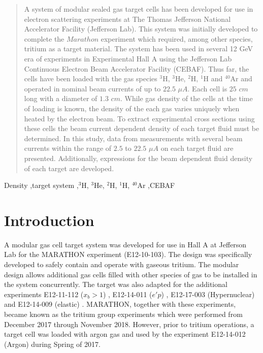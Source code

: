 \documentclass[final,5p,times,twocolumn]{elsarticle}
\begin{document}
\begin{frontmatter}
\begin{abstract}
A system of modular sealed gas target cells has been developed for use in electron scattering experiments at The Thomas Jefferson National Accelerator Facility (Jefferson Lab). This system was initially developed to complete the $Marathon$ experiment which required, among other species, tritium as a target material. The system has been used in several 12 GeV era of experiments in Experimental Hall A using the Jefferson Lab Continuous Electron Beam Accelerator Facility (CEBAF). Thus far, the cells have been loaded with the gas species $^{3}$H, $^{3}$He, $^{2}$H, $^{1}$H and $^{40}$Ar and operated in nominal beam currents of up to $22.5$ $\mu A$.  Each cell is $25$ $cm$ long with a diameter of $1.3$ $cm$. While gas density of the cells at the time of loading is known, the density of the each gas varies uniquely when heated by the electron beam. To extract experimental cross sections using these cells the beam current dependent density of each target fluid must be determined. In this study, data from measurements with several beam currents within the range of $2.5$ to $22.5$ $\mu A$ on each target fluid are presented. Additionally, expressions for the beam dependent fluid density of each target are developed.
 
  
\end{abstract}

\begin{keyword}
Density \sep target system
\sep $^{3}$H, $^{3}$He, $^{2}$H, $^{1}$H, $^{40}$Ar
\sep CEBAF
\end{keyword}
\end{frontmatter}


\section{Introduction}
\label{}

A modular gas cell target system was developed for use in Hall A at Jefferson Lab for the MARATHON experiment (E12-10-103)\cite{marathon}. The design was specifically developed to safely contain and operate with gaseous tritium. The modular design allows additional gas cells filled with other species of gas to be installed in the system concurrently. The target was also adapted for the additional experiments E12-11-112 ($x_{b}>1$) \cite{E12-11-112}, E12-14-011 ($e'p$) \cite{E12-14-011}, E12-17-003 (Hypernuclear) \cite{hypernuclear} and E12-14-009 (elastic) \cite{E12-14-009}.  MARATHON, together with these experiments, became known as the tritium group experiments which were performed from December 2017 through November 2018. However, prior to tritium operations, a target cell was loaded with argon gas and used by the experiment E12-14-012 (Argon) \cite{E12-14-012} during Spring of 2017. 
\end{document}
